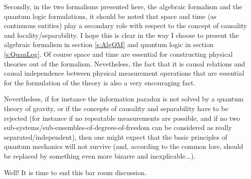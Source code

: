 Secondly, in the two formalisms presented here, the algebraic formalism and the quantum logic formulations, it should be noted that space and time (as  continuous entities)  play a secondary role with respect to the concept of causality and locality/separability. I hope this is clear in the way I choose to present the algebraic formalism in section \ref{s:AlgQM} and quantum logic in section \ref{s:QuanLog}. 
Of course space and time are essential for constructing physical theories out of the formalism.
Nevetheless, the fact that it is causal relations and causal independence between physical measurement operations that are essential for the formulation of the theory is also a very encouraging fact.

Nevertheless, if for instance the information paradox is not solved by a quantum theory of gravity, or if the concepts of causality and separability have to be rejected (for instance if no repeatable measurements are possible, and if no two sub-systems/sub-ensembles-of-degrees-of-freedom can be considered as really separated/independent), then one might expect that the basic principles of quantum mechanics will not survive (and, according to the common lore, should  be replaced by something even more bizarre and inexplicable...).

Well! It is time to end this bar room discussion.



